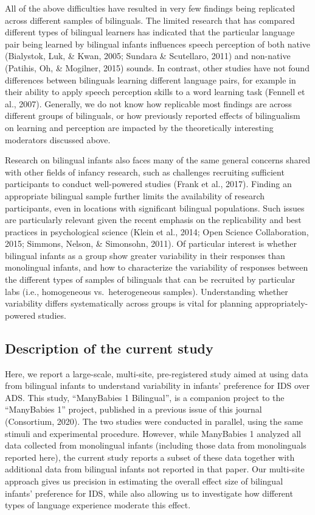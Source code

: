 \documentclass[,man,floatsintext]{apa6}
\begin{document}
All of the above difficulties have resulted in very few findings being replicated across different samples of bilinguals. The limited research that has compared different types of bilingual learners has indicated that the particular language pair being learned by bilingual infants influences speech perception of both native (Bialystok, Luk, \& Kwan, 2005; Sundara \& Scutellaro, 2011) and non-native (Patihis, Oh, \& Mogilner, 2015) sounds. In contrast, other studies have not found differences between bilinguals learning different language pairs, for example in their ability to apply speech perception skills to a word learning task (Fennell et al., 2007). Generally, we do not know how replicable most findings are across different groups of bilinguals, or how previously reported effects of bilingualism on learning and perception are impacted by the theoretically interesting moderators discussed above.

Research on bilingual infants also faces many of the same general concerns shared with other fields of infancy research, such as challenges recruiting sufficient participants to conduct well-powered studies (Frank et al., 2017). Finding an appropriate bilingual sample further limits the availability of research participants, even in locations with significant bilingual populations. Such issues are particularly relevant given the recent emphasis on the replicability and best practices in psychological science (Klein et al., 2014; Open Science Collaboration, 2015; Simmons, Nelson, \& Simonsohn, 2011). Of particular interest is whether bilingual infants as a group show greater variability in their responses than monolingual infants, and how to characterize the variability of responses between the different types of samples of bilinguals that can be recruited by particular labs (i.e., homogeneous vs.~heterogeneous samples). Understanding whether variability differs systematically across groups is vital for planning appropriately-powered studies.

\hypertarget{description-of-the-current-study}{%
\subsection{Description of the current study}\label{description-of-the-current-study}}

Here, we report a large-scale, multi-site, pre-registered study aimed at using data from bilingual infants to understand variability in infants' preference for IDS over ADS. This study, \enquote{ManyBabies 1 Bilingual}, is a companion project to the \enquote{ManyBabies 1} project, published in a previous issue of this journal (Consortium, 2020). The two studies were conducted in parallel, using the same stimuli and experimental procedure. However, while ManyBabies 1 analyzed all data collected from monolingual infants (including those data from monolinguals reported here), the current study reports a subset of these data together with additional data from bilingual infants not reported in that paper. Our multi-site approach gives us precision in estimating the overall effect size of bilingual infants' preference for IDS, while also allowing us to investigate how different types of language experience moderate this effect.
\end{document}
